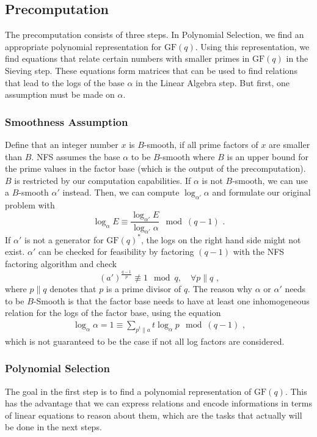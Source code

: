 \documentclass[paper=a4, fontsize=11pt]{scrartcl} %
\numberwithin{equation}{section} %
\numberwithin{figure}{section} %
\numberwithin{table}{section} %
\begin{document}
\subsection{Precomputation}
\label{subsec:precomputation}
The precomputation consists of three steps. In Polynomial Selection, we find an appropriate polynomial representation for $\mathrm{GF}(q)$. Using this representation, we find equations that relate certain numbers with smaller primes in $\mathrm{GF}(q)$ in the Sieving step. These equations form matrices that can be used to find relations that lead to the logs of the base $\alpha$ in the Linear Algebra step. But first, one assumption must be made on $\alpha$.

\subsubsection{Smoothness Assumption}
Define that an integer number $x$ is $B$-smooth, if all prime factors of $x$ are smaller than $B$. NFS assumes the base $\alpha$ to be $B$-smooth where $B$ is an upper bound for the prime values in the factor base (which is the output of the precomputation). $B$ is restricted by our computation capabilities. If $\alpha$ is not $B$-smooth, we can use a $B$-smooth $\alpha'$ instead. Then, we can compute $\log_{\alpha'}\alpha$ and formulate our original problem with
\begin{equation}
\log_\alpha E\equiv\frac{\log_{\alpha'}E}{\log_{\alpha'}\alpha}\mod (q-1)
\text{ .}
\end{equation}
If $\alpha'$ is not a generator for $\mathrm{GF}(q)^*$, the logs on the right hand side might not exist. $\alpha'$ can be checked for feasibility by factoring $(q-1)$ with the NFS factoring algorithm and check
\begin{equation}
(a')^{\frac{q-1}{p}} \not\equiv 1 \mod q,\quad\forall p\parallel q
\text{ ,}
\end{equation}
where $p\parallel q$ denotes that $p$ is a prime divisor of $q$. The reason why $\alpha$ or $\alpha'$ needs to be $B$-Smooth is that the factor base needs to have at least one inhomogeneous relation for the logs of the factor base, using the equation
\begin{eqnarray}
\label{eqn:assumption}
\log_\alpha\alpha = 1 \equiv \sum_{p^t\parallel a}t\log_\alpha p \mod (q-1)
\text{ ,}
\end{eqnarray}
which is not guaranteed to be the case if not all log factors are considered.

\subsubsection{Polynomial Selection}
The goal in the first step is to find a polynomial representation of $\mathrm{GF}(q)$. This has the advantage that we can express relations and encode informations in terms of linear equations to reason about them, which are the tasks that actually will be done in the next steps.
\end{document}
